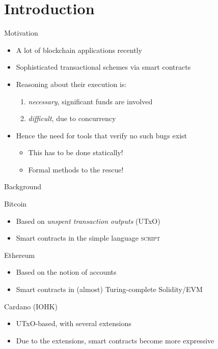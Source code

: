 \section{Introduction}

\begin{frame}{Motivation}
\begin{itemize}
\item A lot of blockchain applications recently
\item Sophisticated transactional schemes via \alert{smart contracts}
\item Reasoning about their execution is:
  \begin{enumerate}
  \item \textit{necessary}, significant funds are involved
  \item \textit{difficult}, due to concurrency
  \end{enumerate}
\item Hence the need for tools that verify no such bugs exist
  \begin{itemize}
  \item This has to be done \alert{statically}!
  \item \alert{Formal methods} to the rescue!
  \end{itemize}
\end{itemize}
\end{frame}

\begin{frame}{Background}

\begin{alertblock}{Bitcoin}
\begin{itemize}
\item Based on \textit{unspent transaction outputs} (UTxO)
\item Smart contracts in the simple language \textsc{script}
\end{itemize}
\end{alertblock}

\begin{alertblock}{Ethereum}
\begin{itemize}
\item Based on the notion of accounts
\item Smart contracts in (almost) Turing-complete Solidity/EVM
\end{itemize}
\end{alertblock}

\begin{alertblock}{Cardano (IOHK)}
\begin{itemize}
\item UTxO-based, with several extensions
\item Due to the extensions, smart contracts become more expressive
\end{itemize}
\end{alertblock}

\end{frame}

